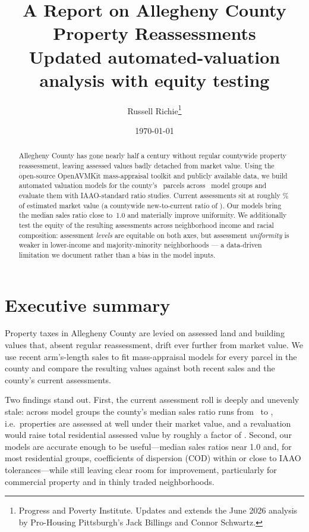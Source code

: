 \documentclass[11pt]{article}
\title{A Report on Allegheny County Property Reassessments\\
       \large Updated automated-valuation analysis with equity testing}
\author{Russell Richie\thanks{Progress and Poverty Institute. Updates and extends the
  June 2026 analysis by Pro-Housing Pittsburgh's Jack Billings and Connor Schwartz.}}
\date{\today}
\begin{document}
\maketitle

\begin{abstract}
\noindent Allegheny County has gone nearly half a century without regular
countywide property reassessment, leaving assessed values badly detached from
market value. Using the open-source OpenAVMKit mass-appraisal toolkit and
publicly available data, we build automated valuation models for the county's
\totalParcels\ parcels across \numModelGroups\ model groups and evaluate them
with IAAO-standard ratio studies. Current assessments sit at roughly
\countyUnderPct\% of estimated market value (a countywide new-to-current ratio
of \countyUnderRatio). Our models bring the median sales ratio close to~1.0 and
materially improve uniformity. We additionally test the equity of the resulting
assessments across neighborhood income and racial composition: assessment
\emph{levels} are equitable on both axes, but assessment \emph{uniformity} is
weaker in lower-income and majority-minority neighborhoods --- a data-driven
limitation we document rather than a bias in the model inputs.
\end{abstract}

\section{Executive summary}
Property taxes in Allegheny County are levied on assessed land and building
values that, absent regular reassessment, drift ever further from market value.
We use recent arm's-length sales to fit mass-appraisal models for every parcel
in the county and compare the resulting values against both recent sales and the
county's current assessments.

Two findings stand out. First, the current assessment roll is deeply and
unevenly stale: across model groups the county's median sales ratio runs from
\msrCountyUrban\ to \msrCountyCommercial, i.e.\ properties are assessed at well
under their market value, and a revaluation would raise total residential
assessed value by roughly a factor of \countyUnderRatio. Second, our models are
accurate enough to be useful---median sales ratios near 1.0 and, for most
residential groups, coefficients of dispersion (COD) within or close to IAAO
tolerances---while still leaving clear room for improvement, particularly for
commercial property and in thinly traded neighborhoods.
\end{document}
